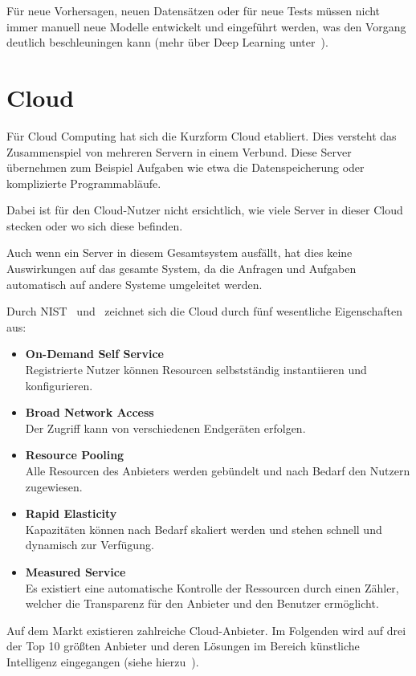 Für neue Vorhersagen, neuen Datensätzen oder für neue Tests müssen nicht immer manuell neue Modelle entwickelt und
eingeführt werden, was den Vorgang deutlich beschleuningen kann (mehr über Deep Learning
unter~\cite{book_grundlagen_machinelearning}).

\section{Cloud}
Für Cloud Computing hat sich die Kurzform Cloud etabliert. Dies versteht das Zusammenspiel von mehreren Servern in einem
Verbund. Diese Server übernehmen zum Beispiel Aufgaben wie etwa die Datenspeicherung oder komplizierte Programmabläufe.

Dabei ist für den Cloud-Nutzer nicht ersichtlich, wie viele Server in dieser Cloud stecken oder wo sich diese befinden.

Auch wenn ein Server in diesem Gesamtsystem ausfällt, hat dies keine Auswirkungen auf das gesamte System, da die
Anfragen und Aufgaben automatisch auf andere Systeme umgeleitet werden.

Durch NIST~\cite{online_grundlagen_cloud_nist} und~\cite{online_grundlagen_cloud_computing} zeichnet sich die Cloud
durch fünf wesentliche Eigenschaften aus:

\begin{itemize}
    \item \textbf{On-Demand Self Service} \\
    Registrierte Nutzer können Resourcen selbstständig instantiieren und konfigurieren.
    \item \textbf{Broad Network Access} \\
    Der Zugriff kann von verschiedenen Endgeräten erfolgen.
    \item \textbf{Resource Pooling} \\
    Alle Resourcen des Anbieters werden gebündelt und nach Bedarf den Nutzern zugewiesen.
    \item \textbf{Rapid Elasticity} \\
    Kapazitäten können nach Bedarf skaliert werden und stehen schnell und dynamisch zur Verfügung.
    \item \textbf{Measured Service} \\
    Es existiert eine automatische Kontrolle der Ressourcen durch einen Zähler, welcher die Transparenz für den
    Anbieter und den Benutzer ermöglicht.
\end{itemize}

Auf dem Markt existieren zahlreiche Cloud-Anbieter. Im Folgenden wird auf drei der Top 10 größten Anbieter und deren
Lösungen im Bereich künstliche Intelligenz eingegangen (siehe hierzu~\cite{online_grundlagen_cloud}).

